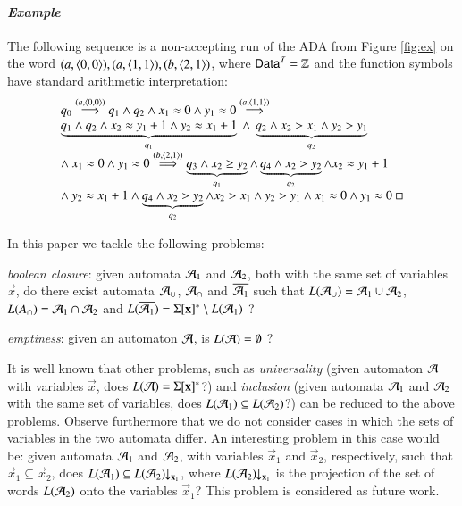 \documentclass[10pt,conference,letterpaper,twocolumn]{IEEEtran}
\begin{document}
\paragraph{\em Example} 
The following sequence is a non-accepting run of the ADA from Figure
\ref{fig:ex} on the word
$(a,\left\langle 0,0 \right\rangle),(a,\left\langle 1,1 \right\rangle),(b,\left\langle 2,1 \right\rangle)$, where $\mathsf{Data}^{\mathcal{I}} =
{\bf \mathbb{Z}}$ and the function symbols have standard arithmetic
interpretation:
\[\begin{array}{l}
q_0 \stackrel{(a,\tuple{0,0})}{\Longrightarrow} 
q_1 \wedge q_2 \wedge x_1\teq0 \wedge y_1\teq0 \stackrel{(a,\tuple{1,1})}{\Longrightarrow} \\ 
\underbrace{q_1 \wedge q_2 \wedge x_2\teq y_1+1 \wedge y_2\teq x_1+1}_{q_1} ~\wedge~
\underbrace{q_2 \wedge x_2>x_1 \wedge y_2>y_1}_{q_2} \\ 
\wedge~ x_1\teq0 \wedge y_1\teq0 \stackrel{(b,\tuple{2,1})}{\Longrightarrow} 
\underbrace{q_3 \wedge x_2\geq y_2}_{q_1} \wedge \underbrace{q_4 \wedge x_2>y_2}_{q_2} \wedge x_2\teq y_1+1 \\ 
\wedge~ y_2\teq x_1+1 \wedge \underbrace{q_4 \wedge x_2>y_2}_{q_2} \wedge x_2>x_1 \wedge y_2>y_1 \wedge x_1\teq0 \wedge y_1\teq0 ~\hfill\text{\qed}
\end{array}\]

In this paper we tackle the following problems: \begin{compactenum}
\item \emph{boolean closure}: given automata $\mathcal{A}_1$ and $\mathcal{A}_2$, both
  with the same set of variables $\vec{x}$, do there exist automata
  $\mathcal{A}_\cup$, $\mathcal{A}_\cap$ and $\overline{\mathcal{A}_1}$ such that $L(\mathcal{A}_\cup) =
  \mathcal{A}_1 \cup \mathcal{A}_2$, $L(A_\cap) = \mathcal{A}_1 \cap \mathcal{A}_2$ and
  $L(\overline{\mathcal{A}_1}) = \Sigma[\mathbf x]^* \setminus L(\mathcal{A}_1)$ ?
%
\item \emph{emptiness}: given an automaton $\mathcal{A}$, is $L(\mathcal{A}) =
  \emptyset$ ?
\end{compactenum}

It is well known that other problems, such as \emph{universality}
(given automaton $\mathcal{A}$ with variables $\vec{x}$, does $L(\mathcal{A}) =
\Sigma[\mathbf x]^*$?) and \emph{inclusion} (given automata $\mathcal{A}_1$ and
$\mathcal{A}_2$ with the same set of variables, does $L(\mathcal{A}_1) \subseteq
L(\mathcal{A}_2)$?) can be reduced to the above problems. Observe furthermore
that we do not consider cases in which the sets of variables in the
two automata differ. An interesting problem in this case would be: given
automata $\mathcal{A}_1$ and $\mathcal{A}_2$, with variables $\vec{x}_1$ and
$\vec{x}_2$, respectively, such that $\vec{x}_1 \subseteq \vec{x}_2$,
does $L(\mathcal{A}_1) \subseteq {L(\mathcal{A}_2)}\!\!\downarrow_{{\mathbf x_1}}$, where
${L(\mathcal{A}_2)}\!\!\downarrow_{{\mathbf x_1}}$ is the projection of the set of words
$L(\mathcal{A}_2)$ onto the variables $\vec{x}_1$? This problem is considered
as future work.
\end{document}
